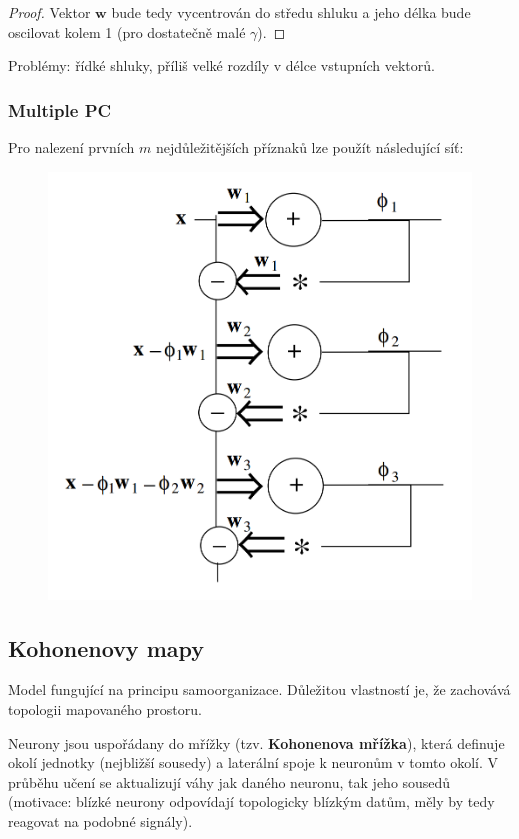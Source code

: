 \documentclass[11pt]{report} %
\renewcommand{\vec}[1]{\mathbf{#1}}
\numberwithin{equation}{section}
\begin{document}
\begin{proof}
Vektor $\vec{w}$ bude tedy vycentrován do středu shluku a jeho délka bude oscilovat kolem 1 (pro dostatečně malé $\gamma$). 
\end{proof}

Problémy: řídké shluky, příliš velké rozdíly v délce vstupních vektorů.

\subsubsection{Multiple PC}
Pro nalezení prvních $m$ nejdůležitějších příznaků lze použít následující síť:
\begin{figure}[h]
	\centering
	\includegraphics[scale=1]{img/multipca.png}
\end{figure}



\subsection{Kohonenovy mapy}
Model fungující na principu samoorganizace. Důležitou vlastností je, že zachovává topologii mapovaného prostoru.

Neurony jsou uspořádany do mřížky (tzv. \textbf{Kohonenova mřížka}), která definuje okolí jednotky (nejbližší sousedy) a laterální spoje k neuronům v tomto okolí. V průběhu učení se aktualizují váhy jak daného neuronu, tak jeho sousedů (motivace: blízké neurony odpovídají topologicky blízkým datům, měly by tedy reagovat na podobné signály).
\end{document}
